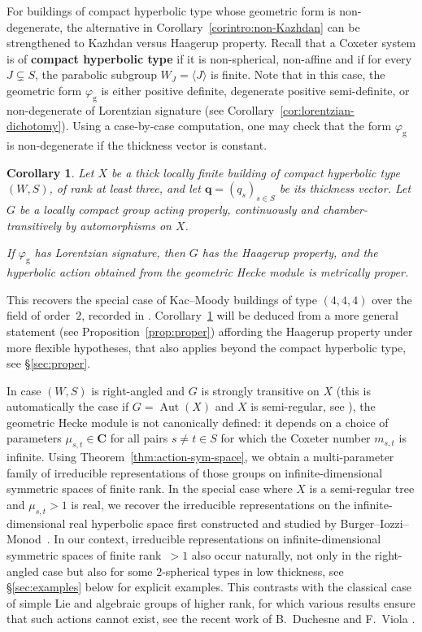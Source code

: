 \documentclass[12pt,a4paper]{amsproc}
\newtheorem{corintro}[thmintro]{Corollary}
\theoremstyle{definition}
\DeclareMathOperator{\Aut}{Aut}
\newcommand{\CC}{\mathbf C}
\newcommand{\qq}{\mathbf q}
\newcommand{\rg}{\mathrm g}
\begin{document}
For buildings of compact hyperbolic type whose geometric form is non-degenerate, the alternative in Corollary~\ref{corintro:non-Kazhdan} can be strengthened to Kazhdan versus Haagerup property.
Recall that a Coxeter system is of \textbf{compact hyperbolic type}
if it is non-spherical, non-affine and if for every $J \subsetneq S$, the parabolic subgroup $W_J = \langle J \rangle$ is finite.  Note that in this case, the geometric form $\varphi_\rg$ is either positive definite, degenerate positive semi-definite, or non-degenerate of Lorentzian signature (see Corollary~\ref{cor:lorentzian-dichotomy}). Using a case-by-case computation, one may check that  the form $\varphi_\rg$ is non-degenerate if the thickness vector is constant.

\begin{corintro}
\label{corintro:Haagerup}
Let $X$ be a thick locally finite building of compact hyperbolic type $(W,S)$, of rank at least three, and let $\qq=(q_s)_{s\in S}$ be its thickness vector. Let $G$ be a locally compact group acting properly, continuously and chamber-transitively by automorphisms on $X$.

If $\varphi_\rg$ has Lorentzian signature, then $G$ has the Haagerup property, and the hyperbolic action obtained from the geometric Hecke module is metrically proper.
\end{corintro}

This recovers the special case of Kac--Moody  buildings of type $(4, 4, 4)$  over the field of order~$2$, recorded in \cite[Proposition~7.1]{CapTho}. Corollary~\ref{corintro:Haagerup} will be deduced from a more general statement (see Proposition~\ref{prop:proper}) affording the Haagerup property under more flexible hypotheses, that also applies beyond the compact hyperbolic type, see \S\ref{sec:proper}. 
	
\medskip	
 In case $(W, S)$ is right-angled and $G$ is strongly transitive on $X$ (this is automatically the case if $G = \Aut(X)$ and $X$ is semi-regular, see \cite{CapRAB}), the geometric Hecke module is not canonically defined: it depends on a choice of parameters $\mu_{s, t} \in \CC$ for all pairs $s \neq t \in S$ for which the Coxeter number $m_{s, t}$ is infinite. Using Theorem~\ref{thm:action-sym-space}, we obtain a multi-parameter family of irreducible representations of those groups on infinite-dimensional symmetric spaces of finite rank. In the special case where $X$ is a semi-regular tree and $\mu_{s, t} >1$ is real, we recover the irreducible representations on the infinite-dimensional real hyperbolic space first constructed and studied by Burger--Iozzi--Monod~\cite{BIM}. In our context, irreducible representations on infinite-dimensional symmetric spaces of   finite  rank~$>1$ also occur naturally, not only in the right-angled case but also for some $2$-spherical types in low thickness, see \S\ref{sec:examples} below for   explicit examples. This contrasts with the classical case of simple Lie and algebraic groups of higher rank, for which various results ensure that such actions cannot exist, see the recent work of B.~Duchesne \cite{Duchesne_2023} and F.~Viola \cite{Viola}.
\end{document}
